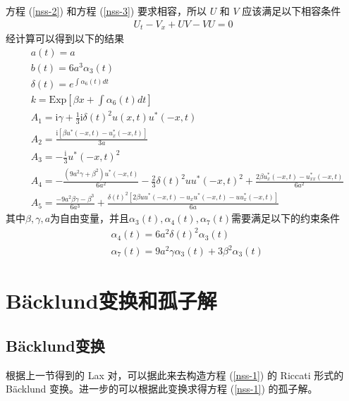 方程 (\ref{nss-2}) 和方程 (\ref{nss-3}) 要求相容，所以 $U$ 和 $V$ 应该满足以下相容条件
\begin{align}
U_{t} - V_{x} + UV - VU = 0
\end{align}
经计算可以得到以下的结果
\begin{align}
  & a(t) = a \\
  & b(t) = 6a^{3}\alpha_{3}(t) \\
  & \delta(t) = e^{\int \alpha_6(t)dt} \\
  & k =\mathrm{Exp}\left[\beta x + \int \alpha_6(t)dt \right] \\
  & A_{1} =  \mathrm{i}\gamma + \frac{1}{3}\mathrm{i}\delta(t)^2u(x,t)u^*(-x,t) \\
  & A_{2} = \frac{\mathrm{i}\left[\beta u^*(-x,t) - u^*_x(-x,t)\right]}{3a}  \\
  & A_{3} = -\frac{\mathrm{i}}{3}u^{*}(-x,t)^{2}  \\
  & A_{4} = -\frac{(9a^2\gamma+\beta^2)u^*(-x,t)}{6a^2}-\frac{2}{3}\delta(t)^2uu^*(-x,t)^2 +\frac{2\beta u^*_x(-x,t) - u^*_{xx}(-x,t)}{6a^2} \\
  & A_{5} = \frac{-9a^2\beta \gamma - \beta^3}{6a^3} + \frac{\delta(t)^2\left[2\beta uu^*(-x,t) - u_xu^*(-x,t) - uu^*_x(-x,t)\right]}{6a}
\end{align}
其中$\beta, \gamma, a$为自由变量，并且$\alpha_{3}(t), \alpha_{4}(t), \alpha_{7}(t)$需要满足以下的约束条件
\begin{align}
  & \alpha_{4}(t) = 6a^{2}\delta(t)^{2}\alpha_{3}(t) \\
  & \alpha_{7}(t) = 9a^2\gamma\alpha_3(t) + 3\beta^2\alpha_3(t)
\end{align}

\section{B\"acklund变换和孤子解}
\subsection{B\"acklund变换}
根据上一节得到的 Lax 对，可以据此来去构造方程 (\ref{nss-1}) 的 Riccati 形式的 B\"acklund 变换。进一步的可以根据此变换求得方程 (\ref{nss-1}) 的孤子解。

